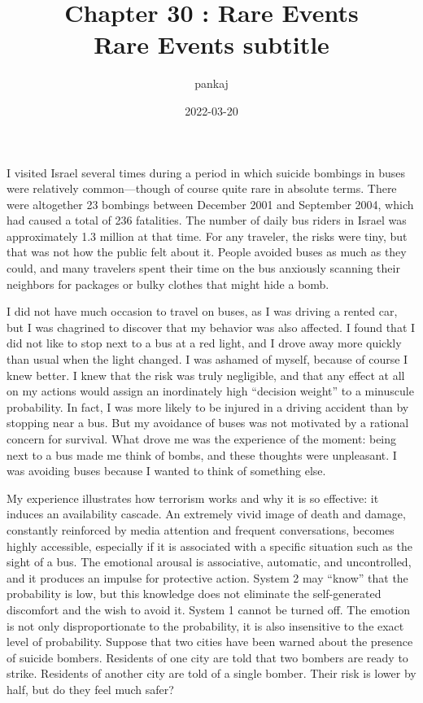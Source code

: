 \documentclass[11pt]{article}
\author{pankaj}
\date{2022-03-20}
\title{Chapter 30 : Rare Events\\\medskip
\large Rare Events subtitle}
\begin{document}
\maketitle
\tableofcontents

I visited Israel several times during a period in which suicide bombings in buses were relatively common—though of course quite rare in absolute terms. There were altogether 23 bombings between December 2001 and September 2004, which had caused a total of 236 fatalities. The number of daily bus riders in Israel was approximately 1.3 million at that time. For any traveler, the risks were tiny, but that was not how the public felt about it. People avoided buses as much as they could, and many travelers spent their time on the bus anxiously scanning their neighbors for packages or bulky clothes that might hide a bomb.

I did not have much occasion to travel on buses, as I was driving a rented car, but I was chagrined to discover that my behavior was also affected. I found that I did not like to stop next to a bus at a red light, and I drove away more quickly than usual when the light changed. I was ashamed of myself, because of course I knew better. I knew that the risk was truly negligible, and that any effect at all on my actions would assign an inordinately high “decision weight” to a minuscule probability. In fact, I was more likely to be injured in a driving accident than by stopping near a bus. But my avoidance of buses was not motivated by a rational concern for survival. What drove me was the experience of the moment: being next to a bus made me think of bombs, and these thoughts were unpleasant. I was avoiding buses because I wanted to think of something else.

My experience illustrates how terrorism works and why it is so effective: it induces an availability cascade. An extremely vivid image of death and damage, constantly reinforced by media attention and frequent conversations, becomes highly accessible, especially if it is associated with a specific situation such as the sight of a bus. The emotional arousal is associative, automatic, and uncontrolled, and it produces an impulse for protective action. System 2 may “know” that the probability is low, but this knowledge does not eliminate the self-generated discomfort and the wish to avoid it. System 1 cannot be turned off. The emotion is not only disproportionate to the probability, it is also insensitive to the exact level of probability. Suppose that two cities have been warned about the presence of suicide bombers. Residents of one city are told that two bombers are ready to strike. Residents of another city are told of a single bomber. Their risk is lower by half, but do they feel much safer?
\end{document}
